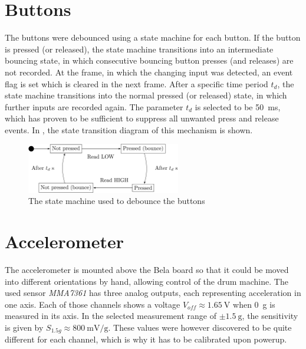 \documentclass[a4paper, 12pt]{article}
\begin{document}
\section{Buttons}
The buttons were debounced using a state machine for each button. If the button is pressed (or released), the state machine transitions into an intermediate bouncing state, in which consecutive bouncing button presses (and releases) are not recorded. At the frame, in which the changing input was detected, an event flag is set which is cleared in the next frame. After a specific time period $t_d$, the state machine transitions into the normal pressed (or released) state, in which further inputs are recorded again. The parameter $t_d$ is selected to be \SI{50}{\milli\second}, which has proven to be sufficient to suppress all unwanted press and release events. In , the state transition diagram of this mechanism is shown.

\begin{figure}[h!]
	\centering
	\includegraphics[width=0.6\textwidth]{button_stm.png}
	\caption{The state machine used to debounce the buttons}
	\label{fig:button-stm}
\end{figure}

\section{Accelerometer}
The accelerometer is mounted above the Bela board so that it could be moved into different orientations by hand, allowing control of the drum machine. The used sensor \emph{MMA7361} \cite{Freescale2008} has three analog outputs, each representing acceleration in one axis. Each of those channels shows a voltage $V_{off} \approx \SI{1.65}{\volt}$ when \SI{0}{\gram} is measured in its axis. In the selected measurement range of $\pm \SI{1.5}{\gram}$, the sensitivity is given by $S_{1.5g} \approx \SI{800}{\milli\volt\per\gram}$. These values were however discovered to be quite different for each channel, which is why it has to be calibrated upon powerup. 
\end{document}

